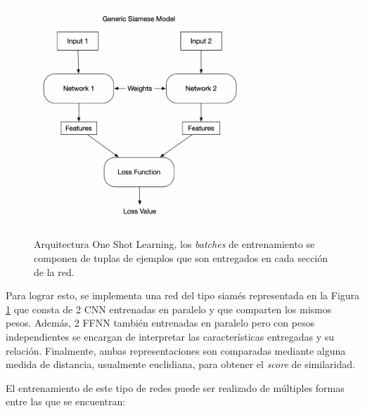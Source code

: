 \begin{figure}[ht]
    \centering
    \includegraphics[width=8cm]{img/tesis/siamese.png}
    \caption{Arquitectura One Shot Learning, los \textit{batches} de entrenamiento se componen de tuplas de ejemplos que son entregados en cada sección de la red.}
    \label{fig:oneshot}
\end{figure}


Para lograr esto, se implementa una red del tipo siamés representada en la Figura \ref{fig:oneshot} que consta de 2 CNN entrenadas en paralelo y que comparten los mismos pesos. Además, 2 FFNN también entrenadas en paralelo pero con pesos independientes se encargan de interpretar las características entregadas y su relación. Finalmente, ambas representaciones son comparadas mediante alguna medida de distancia, usualmente euclidiana, para obtener el \textit{score} de similaridad. 

\vspace{0.2cm}

El entrenamiento de este tipo de redes puede ser realizado de múltiples formas entre las que se encuentran: 

